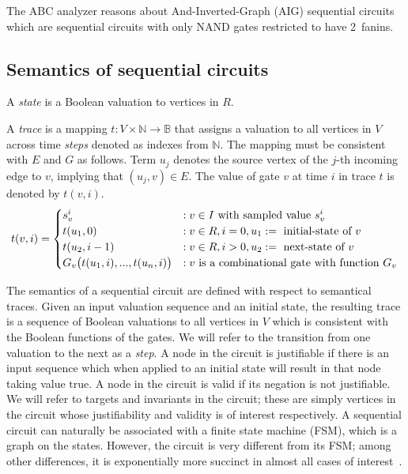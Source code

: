 The ABC analyzer reasons about And-Inverted-Graph (AIG)
sequential circuits which are
sequential circuits with only NAND gates restricted to have 2~fanins.

\subsection{Semantics of sequential circuits}
\label{s:back:crct_semantics}

\begin{definition}[State]
\rm A {\em state} is a Boolean valuation to vertices in $R$. 
\end{definition}

\begin{definition}[Trace]
\rm A {\em trace} is a mapping $t: V \times \mathbb{N} \rightarrow
\mathbb{B}$ that assigns a valuation to all vertices in
$V$ across time {\em steps} denoted as indexes from
$\mathbb{N}$.  The mapping must be consistent with $E$ and
$G$ as follows.  Term $u_{j}$ denotes the source vertex of
the $j$-th incoming edge to $v$, implying that
$(u_{j},v)\in E$.  The value of gate $v$ at time $i$ in
trace $t$ is denoted by $t(v,i)$.
\[
t(v,i)=
   \begin{cases}
      s^i_{v}            &:v \in I \ \text{with sampled value $s_{v}^i$}\\
      t(u_1, 0)       &:v \in R,i=0,u_1:=\ \text{initial-state of $v$}\\
      t(u_2, i-1)        &:v \in R,i>0,u_2:=\ \text{next-state of $v$}\\
      G_v\big(t(u_{1},i),...,t(u_{n},i)\big) &: v \ \text{is a combinational gate with function 
$G_v$}
   \end{cases} \\
\]
\end{definition}

The semantics of a sequential circuit are defined with
respect to semantical traces.  Given an input valuation
sequence and an initial state, the resulting trace is a
sequence of Boolean valuations to all vertices in $V$
which is consistent with the Boolean functions of the
gates.  We will refer to the transition from one valuation
to the next as a {\em step}.  A node in the circuit is
justifiable if there is an input sequence which when
applied to an initial state will result in that node
taking value $\mbox{true}$.  A node in the circuit is
valid if its negation is not justifiable.  We will refer
to targets and invariants in the circuit; these are simply
vertices in the circuit whose justifiability and validity
is of interest respectively.
A sequential circuit can naturally
be associated with a finite state machine (FSM),
which is a graph on the states.  However, the 
circuit is very different from its FSM; among
other differences, it is exponentially more succinct in
almost all cases of interest~\cite{BuClMcDiHw92}. 

